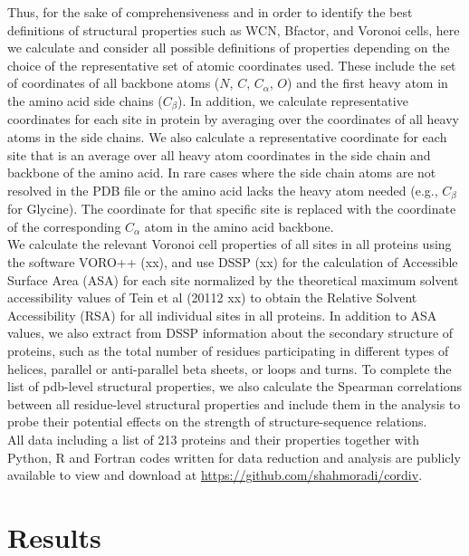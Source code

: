 \documentclass[11pt]{article}
\begin{document}
    Thus, for the sake of comprehensiveness and in order to identify the best definitions of structural properties such as WCN, Bfactor, and Voronoi cells, here we calculate and consider all possible definitions of properties depending on the choice of the representative set of atomic coordinates used. These include the set of coordinates of all backbone atoms ($N$, $C$, $C_\alpha$, $O$) and the first heavy atom in the amino acid side chains ($C_\beta$). In addition, we calculate representative coordinates for each site in protein by averaging over the coordinates of all heavy atoms in the side chains. We also calculate a representative coordinate for each site that is an average over all heavy atom coordinates in the side chain and backbone of the amino acid. In rare cases where the side chain atoms are not resolved in the PDB file or the amino acid lacks the heavy atom needed (e.g., $C_\beta$ for Glycine). The coordinate for that specific site is replaced with the coordinate of the corresponding $C_\alpha$ atom in the amino acid backbone.
    \\

    We calculate the relevant Voronoi cell properties of all sites in all proteins using the software VORO++ (xx), and use DSSP (xx) for the calculation of Accessible Surface Area (ASA) for each site normalized by the theoretical maximum solvent accessibility values of Tein et al (20112 xx) to obtain the Relative Solvent Accessibility (RSA) for all individual sites in all proteins. In addition to ASA values, we also extract from DSSP information about the secondary structure of proteins, such as the total number of residues participating in different types of helices, parallel or anti-parallel beta sheets, or loops and turns. To complete the list of pdb-level structural properties, we also calculate the Spearman correlations between all residue-level structural properties and include them in the analysis to probe their potential effects on the strength of structure-sequence relations.
    \\

    All data including a list of 213 proteins and their properties together with Python, R and Fortran codes written for data reduction and analysis are publicly available to view and download at \url{https://github.com/shahmoradi/cordiv}.


\section{Results}
\label{sec:results}
\end{document}
